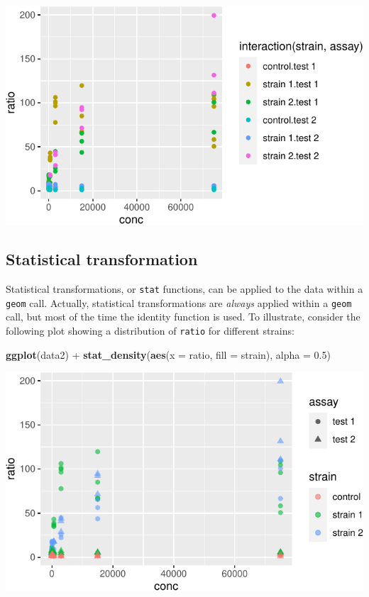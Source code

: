 \documentclass[]{book}
\newenvironment{Shaded}{}{}
\newcommand{\DataTypeTok}[1]{\textcolor[rgb]{0.56,0.13,0.00}{#1}}
\newcommand{\FloatTok}[1]{\textcolor[rgb]{0.25,0.63,0.44}{#1}}
\newcommand{\KeywordTok}[1]{\textcolor[rgb]{0.00,0.44,0.13}{\textbf{#1}}}
\newcommand{\NormalTok}[1]{#1}
\newcommand{\OperatorTok}[1]{\textcolor[rgb]{0.40,0.40,0.40}{#1}}
\newcommand{\StringTok}[1]{\textcolor[rgb]{0.25,0.44,0.63}{#1}}
\begin{document}
\begin{center}\includegraphics[width=\textwidth]{TRES-Tidy-Tutorial_files/figure-latex/unnamed-chunk-111-1} \end{center}

\hypertarget{statistical-transformation}{%
\subsection{Statistical transformation}\label{statistical-transformation}}

Statistical transformations, or \texttt{stat} functions, can be applied to the data within a \texttt{geom} call. Actually, statistical transformations are \emph{always} applied within a \texttt{geom} call, but most of the time the identity function is used. To illustrate, consider the following plot showing a distribution of \texttt{ratio} for different strains:

\begin{Shaded}
\begin{Highlighting}[]
\KeywordTok{ggplot}\NormalTok{(data2) }\OperatorTok{+}
\StringTok{  }\KeywordTok{stat_density}\NormalTok{(}\KeywordTok{aes}\NormalTok{(}\DataTypeTok{x =}\NormalTok{ ratio, }\DataTypeTok{fill =}\NormalTok{ strain), }\DataTypeTok{alpha =} \FloatTok{0.5}\NormalTok{)}
\end{Highlighting}
\end{Shaded}

\begin{center}\includegraphics[width=\textwidth]{TRES-Tidy-Tutorial_files/figure-latex/unnamed-chunk-112-1} \end{center}
\end{document}
